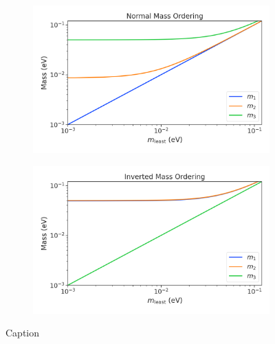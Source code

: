 \begin{figure}[htbp]
    \centering
    \begin{subfigure}{0.49\textwidth}
        \includegraphics*[width=\textwidth]{figs/Chapter-2/230302_mass_estate_vals_normal.png}
        \caption{}
    \end{subfigure}
    \hfill
    \begin{subfigure}{0.49\textwidth}
        \includegraphics*[width=\textwidth]{figs/Chapter-2/230302_mass_estate_vals_inverted.png}
        \caption{}
    \end{subfigure}
    \caption{Caption}
    \label{fig:chap2-mass-estates}
\end{figure}


